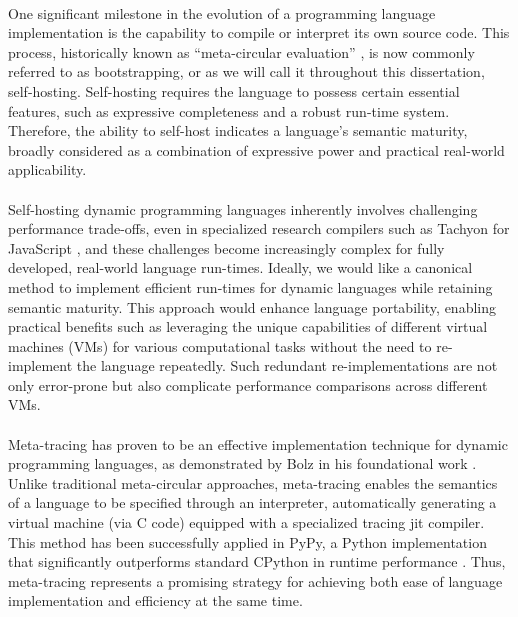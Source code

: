         \paragraph{}%
            One significant milestone in the evolution of a programming language implementation is the capability to compile or interpret its own source code. This process, historically known as “meta-circular evaluation” \cite{sicpbook}, is now commonly referred to as bootstrapping, or as we will call it throughout this dissertation, self-hosting. Self-hosting requires the language to possess certain essential features, such as expressive completeness and a robust run-time system. Therefore, the ability to self-host indicates a language's semantic maturity, broadly considered as a combination of expressive power and practical real-world applicability.

        \paragraph{}%
            Self-hosting dynamic programming languages inherently involves challenging performance trade-offs, even in specialized research compilers such as Tachyon for JavaScript \cite{self-hosted-tachyon}, and these challenges become increasingly complex for fully developed, real-world language run-times. Ideally, we would like a canonical method to implement efficient run-times for dynamic languages while retaining semantic maturity. This approach would enhance language portability, enabling practical benefits such as leveraging the unique capabilities of different virtual machines (VMs) for various computational tasks without the need to re-implement the language repeatedly. Such redundant re-implementations are not only error-prone but also complicate performance comparisons across different VMs.

        \paragraph{}%
            Meta-tracing has proven to be an effective implementation technique for dynamic programming languages, as demonstrated by Bolz in his foundational work \cite{bolzPhDThesis}. Unlike traditional meta-circular approaches, meta-tracing enables the semantics of a language to be specified through an interpreter, automatically generating a virtual machine (via C code) equipped with a specialized tracing \gls{jit} compiler. This method has been successfully applied in PyPy, a Python implementation that significantly outperforms standard CPython in runtime performance \cite{pypy-main}. Thus, meta-tracing represents a promising strategy for achieving both ease of language implementation and efficiency at the same time.


